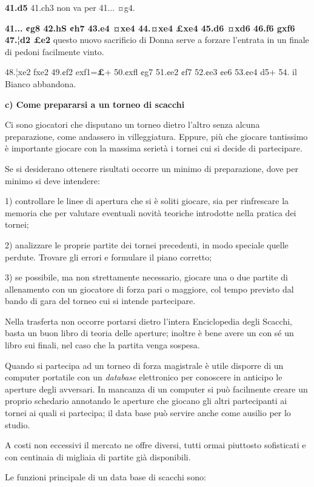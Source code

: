 \textbf{41.d5} 41.ch3 non va per 41... ¤g4.

\textbf{41... ¢g8 42.hS ¢h7 43.e4 ¤xe4 44.¤xe4 £xe4 45.d6 ¤xd6 46.f6
gxf6 47.¦d2 £e2} questo nuovo sacrificio di Donna serve a forzare
l'entrata in un finale di pedoni facilmente vinto.

48.¦xe2 fxe2 49.¢f2 exf1=\textbf{£}+ 50.¢xfl ¢g7 51.¢e2 ¢f7 52.¢e3 ¢e6
53.¢e4 d5+ 54. il Bianco abbandona.

\textbf{c) Come prepararsi a un torneo di scacchi}

Ci sono giocatori che disputano un torneo dietro l'altro senza alcuna
preparazione, come andassero in villeggiatura. Eppure, più che giocare
tantissimo è importante giocare con la massima serietà i tornei cui si
decide di partecipare.

Se si desiderano ottenere risultati occorre un minimo di preparazione,
dove per minimo si deve intendere:

1) controllare le linee di apertura che si è soliti giocare, sia per
rinfrescare la memoria che per valutare eventuali novità teoriche
introdotte nella pratica dei tornei;

2) analizzare le proprie partite dei tornei precedenti, in modo speciale
quelle perdute. Trovare gli errori e formulare il piano corretto;

3) se possibile, ma non strettamente necessario, giocare una o due
partite di allenamento con un giocatore di forza pari o maggiore, col
tempo previsto dal bando di gara del torneo cui si intende partecipare.

Nella trasferta non occorre portarsi dietro l'intera Enciclopedia degli
Scacchi, basta un buon libro di teoria delle aperture; inoltre è bene
avere un con sé un libro sui finali, nel caso che la partita venga
sospesa.

Quando si partecipa ad un torneo di forza magistrale è utile disporre di
un computer portatile con un \emph{database} elettronico per conoscere
in anticipo le aperture degli avversari. In mancanza di un computer si
può facilmente creare un proprio schedario annotando le aperture che
giocano gli altri partecipanti ai tornei ai quali si partecipa; il data
base può servire anche come ausilio per lo studio.

A costi non eccessivi il mercato ne offre diversi, tutti ormai piuttosto
sofisticati e con centinaia di migliaia di partite già disponibili.

Le funzioni principale di un data base di scacchi sono:

